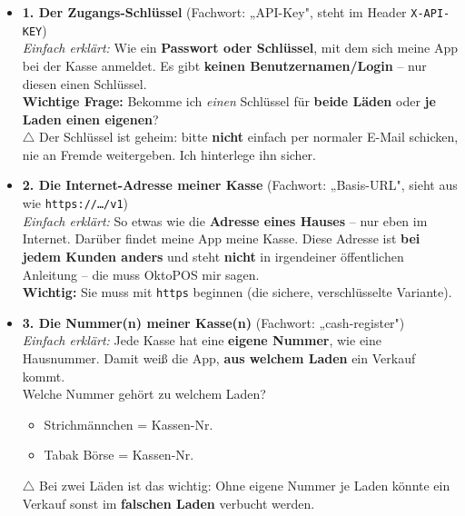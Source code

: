 \documentclass[11pt,a4paper]{article}
\newcommand{\cb}{{\Large$\square$}\ }
\newcommand{\code}[1]{\texttt{\small #1}}
\newcommand{\techniker}[1]{{\footnotesize\color{dunkelgrau}#1}}
\begin{document}
\begin{itemize}

  \item[\cb] \textbf{1. Der Zugangs-Schlüssel}
        \techniker{(Fachwort: „API-Key", steht im Header \code{X-API-KEY})}\\[2pt]
        \emph{Einfach erklärt:} Wie ein \textbf{Passwort oder Schlüssel}, mit dem sich meine App bei
        der Kasse anmeldet. Es gibt \textbf{keinen Benutzernamen/Login} – nur diesen einen Schlüssel.\\
        \textbf{Wichtige Frage:} Bekomme ich \emph{einen} Schlüssel für \textbf{beide Läden}
        oder \textbf{je Laden einen eigenen}?\\
        {\small\color{red}$\triangle$ Der Schlüssel ist geheim: bitte \textbf{nicht} einfach per normaler E-Mail schicken,
        nie an Fremde weitergeben. Ich hinterlege ihn sicher.}

  \item[\cb] \textbf{2. Die Internet-Adresse meiner Kasse}
        \techniker{(Fachwort: „Basis-URL", sieht aus wie \code{https://\dots/v1})}\\[2pt]
        \emph{Einfach erklärt:} So etwas wie die \textbf{Adresse eines Hauses} – nur eben im Internet.
        Darüber findet meine App meine Kasse. Diese Adresse ist \textbf{bei jedem Kunden anders} und
        steht \textbf{nicht} in irgendeiner öffentlichen Anleitung – die muss OktoPOS mir sagen.\\
        \textbf{Wichtig:} Sie muss mit \code{https} beginnen (die sichere, verschlüsselte Variante).

  \item[\cb] \textbf{3. Die Nummer(n) meiner Kasse(n)}
        \techniker{(Fachwort: „cash-register")}\\[2pt]
        \emph{Einfach erklärt:} Jede Kasse hat eine \textbf{eigene Nummer}, wie eine Hausnummer.
        Damit weiß die App, \textbf{aus welchem Laden} ein Verkauf kommt.\\
        Welche Nummer gehört zu welchem Laden?
        \begin{itemize}
          \item[] Strichmännchen \;=\; Kassen-Nr. \underline{\hspace{4.5cm}}
          \item[] Tabak Börse \;\;\;\;\;=\; Kassen-Nr. \underline{\hspace{4.5cm}}
        \end{itemize}
        {\small\color{red}$\triangle$ Bei zwei Läden ist das wichtig: Ohne eigene Nummer je Laden könnte ein Verkauf
        sonst im \textbf{falschen Laden} verbucht werden.}


\end{itemize}
\end{document}
